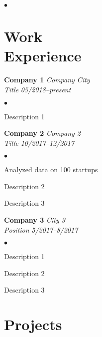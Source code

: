 \documentclass[margin,line]{res}
\newenvironment{list1}{
  \begin{list}{\ding{113}}{%
      \setlength{\itemsep}{0in}
      \setlength{\parsep}{0in} \setlength{\parskip}{0in}
      \setlength{\topsep}{0in} \setlength{\partopsep}{0in}
      \setlength{\leftmargin}{0.17in}}}{\end{list}}
\newenvironment{list2}{
  \begin{list}{$\bullet$}{%
      \setlength{\itemsep}{0in}
      \setlength{\parsep}{0in} \setlength{\parskip}{0in}
      \setlength{\topsep}{0in} \setlength{\partopsep}{0in}
      \setlength{\leftmargin}{0.15in}}}{\end{list}}
\begin{document}
\begin{resume}
\begin{list1}
\begin{list2}
\end{list2}
\vspace*{.05in}
\end{list1}

\vspace{-.1in}

\section{\sc Work\\ Experience}
{\bf Company 1}
\hfill{\emph{Company City}}\\

\vspace{-.8cm}
{\em Title}  \hfill {\emph{05/2018--present}}\\
\vspace{-.4cm}

\begin{list2}
\item Description 1
\end{list2}

{\bf Company 2}
\hfill{\emph{Company 2}}\\

\vspace{-.8cm}
{\em Title} \hfill{\emph{10/2017--12/2017}}\\
\vspace{-.4cm}
\begin{list2}
\item Analyzed data on 100 startups
\item Description 2

\item Description 3
\end{list2}

{\bf Company 3}
\hfill{\emph{City 3}}\\

\vspace{-.8cm}
{\em Position} \hfill{\emph{5/2017--8/2017}}\\
\vspace{-.4cm}
\begin{list2}
\item Description 1 
\item Description 2
\item Description 3
\end{list2}


\section{\sc Projects}


\end{resume}
\end{document}
